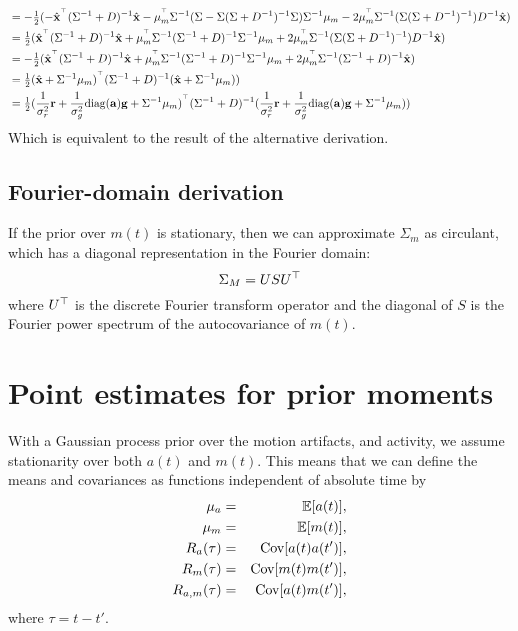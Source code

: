 \documentclass[11pt]{article}
\newcommand{\vx}{\mathbf{x}}
\newcommand{\vecr}{\mathbf{r}}
\newcommand{\vecg}{\mathbf{g}}
\newcommand{\veca}{\mathbf{a}}
\begin{document}
\begin{align*}
& =  -\tonehlf (- \hat{\vx}^\trp(\Sigma^{-1} + D)^{-1}\hat{\vx} - \mu_m^\trp \Sigma^{-1}(\Sigma - \Sigma(\Sigma+ D^{-1})^{-1}\Sigma)\Sigma^{-1}\mu_m -2 \mu_m^\trp \Sigma^{-1}(\Sigma ( \Sigma + D^{-1} )^{-1}) D^{-1} \hat{\vx} )\\
& =  \tonehlf ( \hat{\vx}^\trp(\Sigma^{-1} + D)^{-1}\hat{\vx} + \mu_m^\trp \Sigma^{-1}(\Sigma^{-1} + D)^{-1}\Sigma^{-1}\mu_m +2 \mu_m^\trp \Sigma^{-1}(\Sigma ( \Sigma + D^{-1} )^{-1}) D^{-1} \hat{\vx} )\\
& =  -\tonehlf ( \hat{\vx}^\trp(\Sigma^{-1} + D)^{-1}\hat{\vx} + \mu_m^\trp \Sigma^{-1}(\Sigma^{-1} + D)^{-1}\Sigma^{-1}\mu_m +2 \mu_m^\trp \Sigma^{-1}(\Sigma^{-1} + D)^{-1} \hat{\vx} )\\
& =  \tonehlf ( \hat{\vx}+\Sigma^{-1}\mu_m)^\trp(\Sigma^{-1} + D)^{-1}(\hat{\vx}+\Sigma^{-1}\mu_m) )\\
& =  \tonehlf ( \frac{1}{\sigma_r^2} \vecr+ \frac{1}{\sigma_g^2} \diag(\veca) \vecg+\Sigma^{-1}\mu_m)^\trp(\Sigma^{-1} + D)^{-1}(\frac{1}{\sigma_r^2} \vecr+ \frac{1}{\sigma_g^2} \diag(\veca) \vecg+\Sigma^{-1}\mu_m) )\\
\end{align*}
Which is equivalent to the result of the alternative derivation.

\subsection{Fourier-domain derivation}
If the prior over $m(t)$ is stationary, then we can approximate
$\Sigma_m$ as circulant, which has a diagonal representation in the
Fourier domain:
\begin{equation}
\Sigma_M = U S U{^\top} 
\end{equation}
where $U{^\top}$ is the discrete Fourier transform operator and the
diagonal of $S$ is the Fourier power spectrum of the autocovariance of
$m(t)$. 

\section{Point estimates for prior moments}
With a Gaussian process prior over the motion artifacts, and activity, we assume stationarity over both $a(t)$ and $m(t)$.  This means that we can define the means and covariances as functions independent of absolute time by
\begin{eqnarray}
\mu_a &=&\mathbb{E}[a(t)], \\
\mu_m&=&\mathbb{E}[m(t)],  \\
R_a(\tau) &=& \text{Cov}[a(t)a(t')],\\
R_m(\tau) &=& \text{Cov}[m(t)m(t')],\\
R_{a,m}(\tau) &=& \text{Cov}[a(t)m(t')],
\end{eqnarray}
 where $\tau  = t-t'$.  
 
\end{document}
